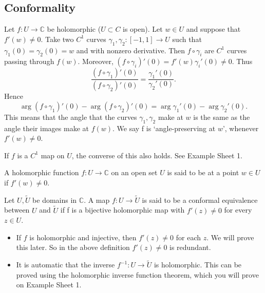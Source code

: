\documentclass[egregdoesnotlikesansseriftitles,a4paper]{scrartcl}
\begin{document}
\subsection{Conformality}
Let $f: U \rightarrow \mathbb{C}$ be holomorphic ($U \subset C $ is open). Let $w \in U$ and suppose that $f' (w) \neq 0$. Take two $C^{1}$ curves $\gamma_1 , \gamma_2 : [-1,1] \rightarrow U$ such that $\gamma_1 (0)=\gamma_2 (0)=w$ and with nonzero derivative. Then $f \circ \gamma_i$ are $C^{1}$ curves passing through $f (w)$. Moreover, $(f \circ \gamma_i)' (0)=f' (w)\gamma_{i}' (0)\neq 0$. Thus \[
\frac{(f \circ \gamma_1 )' (0)}{(f \circ \gamma_2 )' (0)}= \frac{\gamma_1 ' (0)}{\gamma_2 ' (0)}
.\]
Hence \[
\operatorname{arg}(f \circ \gamma_1 )' (0)-\operatorname{arg}(f \circ \gamma_2 )' (0)=\operatorname{arg}\gamma_1 ' (0)-\operatorname{arg}\gamma_2 ' (0)
.\] This means that the angle that the curves $\gamma_1 , \gamma_2 $ make at $w$ is the same as the angle their images make at $f (w)$. We say f is `angle-preserving at $w$', whenever $f' (w) \neq 0$.
\begin{remark}
      If $f$ is a $C^{1}$ map on $U$, the converse of this also holds. See Example Sheet 1. 
\end{remark}
\begin{definition*}
      A holomorphic function $f: U \rightarrow \mathbb{C}$ on an open set $U$ is said to be  at a point $w \in U$ if $f' (w) \neq 0$.
\end{definition*}
\begin{definition*}
      Let $U, \widetilde{U} $ be domains in $\mathbb{C}$. A map $f: U \rightarrow \widetilde{U}$ is said to be a conformal equivalence between $U$ and $\widetilde{U}$ if f is a bijective holomorphic map with $f' (z) \neq 0$ for every $z \in U$.
\end{definition*}
\begin{remark}
      \begin{itemize}
           \item If $f$ is holomorphic and injective, then $f' (z) \neq 0$ for each $z$. We will prove this later. So in the above definition $f' (z) \neq 0$ is redundant. 
           \item It is automatic that the inverse ${f}^{-1}: U \rightarrow \widetilde{U}$ is holomorphic. This can be proved using the holomorphic inverse function theorem, which you will prove on Example Sheet 1.
      \end{itemize}
\end{remark}
\end{document}
